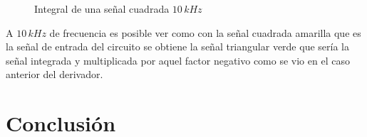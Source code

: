\documentclass[11pt, a4paper]{article}
\begin{document}
\begin{figure}[H]
	\begin{center}
		\caption{Integral de una señal cuadrada $10 \, kHz$}
		\label{fig:IntegralCOMP10kHz}
	\end{center}
\end{figure}

A $10 \, kHz$ de frecuencia es posible ver como con la señal cuadrada amarilla que es la señal de entrada del circuito se obtiene la señal triangular verde que sería la señal integrada y multiplicada por aquel factor negativo como se vio en el caso anterior del derivador.

\section{Conclusión}
\end{document}
